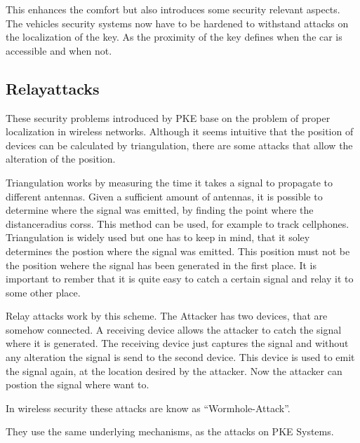 This enhances the comfort but also introduces some security relevant aspects.
The vehicles security systems now have to be hardened
to withstand attacks on the localization of the key.
As the proximity of the key defines when the car is accessible and when not. 

\subsection*{Relayattacks}
These security problems introduced by PKE base on the problem of proper
localization in wireless networks.
Although it seems intuitive that the position of devices can be calculated by
triangulation, there are some attacks that allow the alteration of the position.


Triangulation works by measuring the time it takes a signal to propagate
to different antennas.
Given a sufficient amount of antennas,
it is possible to determine where the signal was emitted,
by finding the point where the distanceradius corss. 				%
This method can be used,
for example to track cellphones.	%
Triangulation is widely used but one has to keep in mind,
that it soley determines the postion where the signal was emitted.
This position must not be the position wehere the signal has been generated in the first place.
It is important to rember that it is quite easy to catch
a certain signal and relay it to some other place.

Relay attacks work by this scheme.
The Attacker has two devices,
that are somehow connected.
A receiving device allows the attacker to catch the signal where it is generated.
The receiving device just captures the signal and
without any alteration the signal is send to the second device.
This device is used to emit the signal again,
at the location desired by the attacker.
Now the attacker can postion the signal where want to.

In wireless security these attacks are know as ``Wormhole-Attack''.

They use the same underlying mechanisms, as the attacks on PKE Systems.
